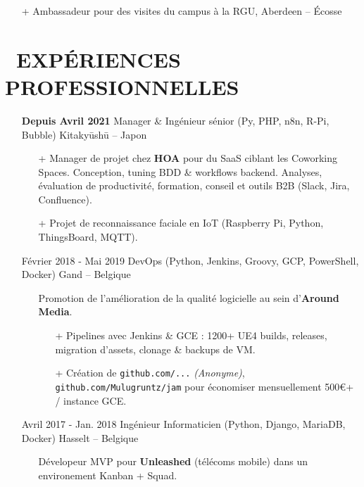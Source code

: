 \documentclass{res}
\begin{document}
\begin{resume}
\begin{itemize}
\begin{itemize}
                  \item[+]  Ambassadeur pour des visites du campus \`a la RGU, Aberdeen -- \'Ecosse
		\end{itemize} 
	\end{itemize}

\pagebreak

\section{\faBriefcase~EXP\'ERIENCES PROFESSIONNELLES}

	\begin{itemize}
		\item[] \textbf{Depuis Avril 2021} \tabto{5cm} Manager \& Ing\'enieur s\'enior (Py, PHP, n8n, R-Pi, Bubble) \hfill Kitaky\=ush\=u -- Japon
		\begin{itemize}
			\item[+] Manager de projet chez \textbf{HOA} pour du SaaS ciblant les Coworking Spaces. Conception, tuning BDD \& workflows backend. Analyses, \'evaluation de productivit\'e, formation, conseil et outils B2B (Slack, Jira, Confluence).
			\item[+] Projet de reconnaissance faciale en IoT (Raspberry Pi, Python, ThingsBoard, MQTT).
		\end{itemize}
		\item[] F\'evrier  2018 - Mai 2019 \tabto{5cm} DevOps (Python, Jenkins, Groovy, GCP, PowerShell, Docker) \hfill Gand -- Belgique
		\begin{itemize}
			\item[] Promotion de l'am\'elioration de la qualit\'e logicielle au sein d'\textbf{Around Media}.
			\begin{itemize}
				\item[+] Pipelines avec Jenkins \& GCE : 1200+ UE4 builds, releases, migration d'assets, clonage \& backups de VM.
				\item[+] Cr\'eation de \ifisanon \texttt{github.com/...} \textit{(Anonyme)}, \else \texttt{github.com/Mulugruntz/jam} \fi pour \'economiser mensuellement 500\euro+ / instance GCE.
			\end{itemize}
		\end{itemize}
		\item[] Avril 2017 - Jan. 2018 \tabto{5cm} Ing\'enieur Informaticien (Python, Django, MariaDB, Docker) \hfill Hasselt -- Belgique
		\begin{itemize}
			\item[] D\'evelopeur MVP pour \textbf{Unleashed} (t\'el\'ecoms mobile) dans un environement Kanban + Squad.

\end{itemize}
\end{itemize}
\end{resume}
\end{document}

